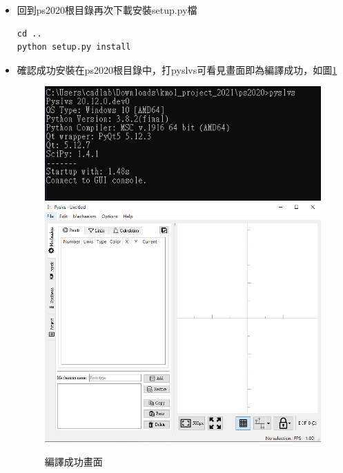 \documentclass[14pt,a4paper]{report}  %
\begin{document}
{		\begin{itemize}
		\item 回到ps2020根目錄再次下載安裝setup.py檔
		\begin{lstlisting}[caption=安裝步驟]
cd ..
python setup.py install
		\end{lstlisting}
		\end{itemize}
		
		\begin{itemize}
		\item {確認成功安裝在ps2020根目錄中，打pyslvs可看見畫面即為編譯成功，如圖\ref{fig_pyslvs:scale}}
      \begin{figure}[hbt!]
        \centering
        \includegraphics[scale=0.6]{輸入pyslvs指令.PNG}
        \includegraphics[scale=0.5]{編譯成功畫面.png}
        \caption{編譯成功畫面}
        \label{fig_pyslvs:scale} 
    	\end{figure}
		\end{itemize}
      

}
\end{document}
